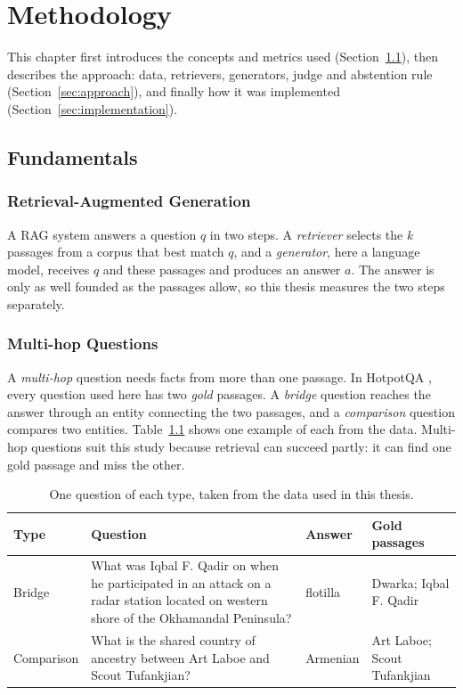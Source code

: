 \chapter{Methodology}\label{chap:methodology}

This chapter first introduces the concepts and metrics used (Section~\ref{sec:fundamentals}), then
describes the approach: data, retrievers, generators, judge and abstention rule
(Section~\ref{sec:approach}), and finally how it was implemented
(Section~\ref{sec:implementation}).

\section{Fundamentals}\label{sec:fundamentals}

\subsection{Retrieval-Augmented Generation}
A RAG system answers a question $q$ in two steps. A \emph{retriever} selects the $k$ passages from
a corpus that best match $q$, and a \emph{generator}, here a language model, receives $q$ and these
passages and produces an answer $a$. The answer is only as well founded as the passages allow, so
this thesis measures the two steps separately.

\subsection{Multi-hop Questions}
A \emph{multi-hop} question needs facts from more than one passage. In HotpotQA
\cite{yang2018hotpotqa}, every question used here has two \emph{gold} passages. A \emph{bridge}
question reaches the answer through an entity connecting the two passages, and a \emph{comparison}
question compares two entities. Table~\ref{tab:examples} shows one example of each from the data.
Multi-hop questions suit this study because retrieval can succeed partly: it can find one gold
passage and miss the other.

\begin{table}[htbp]
\centering\small
\caption{One question of each type, taken from the data used in this thesis.}\label{tab:examples}
\begin{tabular}{@{}>{\raggedright\arraybackslash}p{2.2cm}>{\raggedright\arraybackslash}p{6.5cm}%
                >{\raggedright\arraybackslash}p{1.7cm}>{\raggedright\arraybackslash}p{4cm}@{}}
\toprule
Type & Question & Answer & Gold passages \\
\midrule
Bridge & What was Iqbal F. Qadir on when he participated in an attack on a radar station located on
western shore of the Okhamandal Peninsula? & flotilla & Dwarka; Iqbal F. Qadir \\
Comparison & What is the shared country of ancestry between Art Laboe and Scout Tufankjian? &
Armenian & Art Laboe; Scout Tufankjian \\
\bottomrule
\end{tabular}
\end{table}

